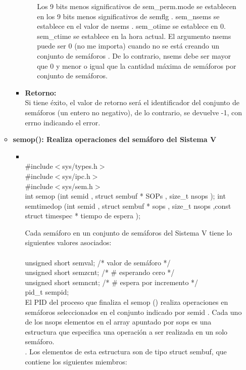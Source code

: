\documentclass[12pt]{article}
\begin{document}
\begin{enumerate}
\begin{itemize}
\begin{itemize}
\begin{itemize}
                        Los 9 bits menos significativos de sem\_perm.mode se establecen en los 9 bits menos significativos de semflg . sem\_nsems se establece en el valor de nsems . sem\_otime se establece en 0. sem\_ctime se establece en la hora actual. 
                        El argumento nsems puede ser 0 (no me importa) cuando no se está creando un conjunto de semáforos . De lo contrario, nsems debe ser mayor que 0 y menor o igual que la cantidad máxima de semáforos por conjunto de semáforos.

                    \end{itemize}
                    \item \textbf{Retorno:}\\
                    Si tiene éxito, el valor de retorno será el identificador del conjunto de semáforos (un entero no negativo), de lo contrario, se devuelve -1, con errno indicando el error.
            \end{itemize}
            \item \textbf{semop(): Realiza operaciones del semáforo del Sistema V}
                \begin{itemize}
                    \item {}\\
                    #include$<$sys/types.h$>$\\ 
                    #include$<$sys/ipc.h$>$ \\
                    #include$<$sys/sem.h$>$ \\
                    int semop (int semid , struct sembuf * SOPs , size\_t nsops ); 
                int semtimedop (int semid , struct sembuf * sops , size\_t nsops ,const struct timespec * tiempo de espera );\\
                    \begin{itemize}
                        Cada semáforo en un conjunto de semáforos del Sistema V tiene lo siguientes valores asociados:\\
                        \\
                            unsigned short  semval;   /* valor de semáforo  */\\
                            unsigned short  semzcnt;  /* # esperando cero  */\\
                            unsigned short  semncnt;  /* # espera por incremento */\\
                            pid\_t           sempid;\\
                            El PID del proceso que finaliza el semop () realiza operaciones en semáforos seleccionados en el conjunto indicado  por semid . Cada uno de los nsops elementos en el array apuntado por sops es una estructura que especifica una operación a ser realizada en un solo semáforo. \\. Los elementos de esta estructura son de tipo struct sembuf, que contiene los siguientes miembros: \\


\end{itemize}
\end{itemize}
\end{itemize}
\end{enumerate}
\end{document}
